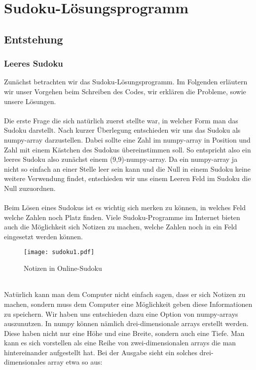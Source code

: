 \documentclass[11pt,a4paper]{article}
\begin{document}
\section{Sudoku-Lösungsprogramm}

\subsection{Entstehung}
\subsubsection{Leeres Sudoku}
Zunächst betrachten wir das Sudoku-Lösungsprogramm. Im Folgenden erläutern wir unser Vorgehen beim Schreiben des Codes, wir erklären die Probleme, sowie unsere Lösungen.\ \\
\ \\
Die erste Frage die sich natürlich zuerst stellte war, in welcher Form man das Sudoku darstellt. Nach kurzer Überlegung entschieden wir uns das Sudoku als numpy-array darzustellen. Dabei sollte eine Zahl im numpy-array in Position und Zahl mit einem Kästchen des Sudokus übereinstimmen soll. So entspricht also ein leeres Sudoku also zunächst einem (9,9)-numpy-array. Da ein numpy-array ja nicht so einfach an einer Stelle leer sein kann und die Null in einem Sudoku keine weitere Verwendung findet, entschieden wir uns einem Leeren Feld im Sudoku die Null zuzuordnen.\\
\ \\
Beim Lösen eines Sudokus ist es wichtig sich merken zu können, in welches Feld welche Zahlen noch Platz finden. Viele Sudoku-Programme im Internet bieten auch die Möglichkeit sich Notizen zu machen, welche Zahlen noch in ein Feld eingesetzt werden können.  
\ \\
\begin{figure}[htbp!]
\begin{center}
\texttt{[image: sudoku1.pdf]}
\end{center}
\caption{Notizen in Online-Sudoku}
\end{figure}
\ \\
Natürlich kann man dem Computer nicht einfach sagen, dass er sich Notizen zu machen, sondern muss dem Computer eine Möglichkeit geben diese Informationen zu speichern. Wir haben uns entschieden dazu eine Option von numpy-arrays auszunutzen. In numpy können nämlich drei-dimensionale arrays erstellt werden. Diese haben nicht nur eine Höhe und eine Breite, sondern auch eine Tiefe. Man kann es sich vorstellen als eine Reihe von zwei-dimensionalen arrays die man hintereinander aufgestellt hat. Bei der Ausgabe sieht ein solches drei-dimensionales array etwa so aus: 
\newpage
\end{document}
